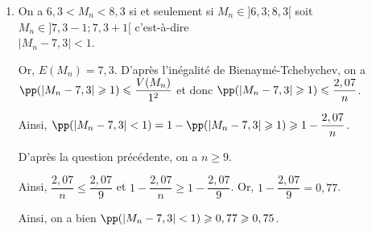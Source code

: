 \documentclass[11pt,fleqn, openany]{book} %
\begin{document}
\begin{solution}
\begin{enumerate}
\begin{enumerate}
Ainsi, $\sigma(M_n)\leqslant 0,5 \Leftrightarrow \sqrt{\dfrac{2,07}{n}} \leqslant 0,5 \Leftrightarrow \dfrac{\sqrt{2,07}}{0,5} \leqslant \sqrt{n}$. Par croissance de la fonction $x\mapsto x^2$ sur $[0;+\infty[$, on a alors $n \geqslant \dfrac{2,07}{0,25}$. Or, $\dfrac{2,07}{0,25}=8,28$. L'entier recherché est donc $n=9$.
\item On a $6,3 < M_n <8,3$ si et seulement si $M_n \in ]6,3 ; 8,3[$ soit $M_n \in ]7,3-1 ; 7,3+1[$ c'est-à-dire \\$|M_n-7,3|<1$.

Or, $E(M_n)=7,3$. D'après l'inégalité de Bienaymé-Tchebychev, on a $\pp(|M_n-7,3| \geqslant 1) \leqslant \dfrac{V(M_n)}{1^2}$ et donc $\pp(|M_n-7,3| \geqslant 1) \leqslant \dfrac{2,07}{n}$.

Ainsi, $\pp(|M_n-7,3|<1)=1-\pp(|M_n-7,3| \geqslant 1)\geqslant 1- \dfrac{2,07}{n}$. 

D'après la question précédente, on a $n\geqslant 9$. 

Ainsi, $\dfrac{2,07}{n} \leqslant \dfrac{2,07}{9}$ et $1-\dfrac{2,07}{n}\geqslant 1-\dfrac{2,07}{9}$. Or, $1-\dfrac{2,07}{9}=0,77$.

Ainsi, on a bien $\pp(|M_n-7,3|<1) \geqslant 0,77 \geqslant 0,75$.
\end{enumerate}
\end{enumerate}
\newpage
\end{solution}
\end{document}
